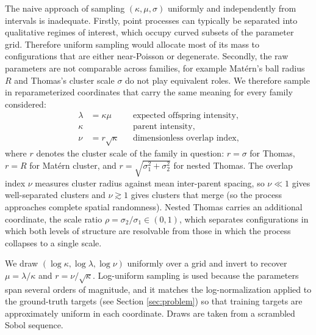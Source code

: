 \documentclass[11pt,letterpaper]{article}
\newcommand{\1}{\mathds{1}}
\theoremstyle{plain}
\theoremstyle{definitioncolon}
\begin{document}
The naive approach of sampling $(\kappa, \mu, \sigma)$ uniformly and
independently from intervals is inadequate. Firstly, point processes can
typically be separated into qualitative regimes of interest, which occupy curved
subsets of the parameter grid. Therefore uniform sampling would allocate most of
its mass to configurations that are either near-Poisson or degenerate. Secondly,
the raw parameters are not comparable across families, for example Mat\'ern's
ball radius $R$ and Thomas's cluster scale $\sigma$ do not play equivalent roles.
We therefore sample in reparameterized coordinates that carry the same meaning
for every family considered:
    \begin{align*}
        \lambda &= \kappa\mu && \text{expected offspring intensity,} \\
        \kappa & && \text{parent intensity,} \\
        \nu &= r\sqrt{\kappa} && \text{dimensionless overlap index,}
    \end{align*}
where $r$ denotes the cluster scale of the family in question: $r = \sigma$ for
Thomas, $r = R$ for Mat\'ern cluster, and $r = \sqrt{\sigma_1^2 + \sigma_2^2}$
for nested Thomas. The overlap index $\nu$ measures cluster radius against mean
inter-parent spacing, so $\nu \ll 1$ gives well-separated clusters and
$\nu \gtrsim 1$ gives clusters that merge (so the process approaches complete
spatial randomness). Nested Thomas carries an additional coordinate, the scale
ratio $\rho = \sigma_2/\sigma_1 \in (0,1)$, which separates configurations in
which both levels of structure are resolvable from those in which the process
collapses to a single scale.

We draw $(\log\kappa, \log\lambda, \log\nu)$ uniformly over a grid and invert to
recover $\mu = \lambda/\kappa$ and $r = \nu/\sqrt{\kappa}$. Log-uniform sampling
is used because the parameters span several orders of magnitude, and it matches
the log-normalization applied to the ground-truth targets (see
Section \ref{sec:problem}) so that training targets are approximately uniform in
each coordinate. Draws are taken from a scrambled Sobol sequence.
\end{document}

